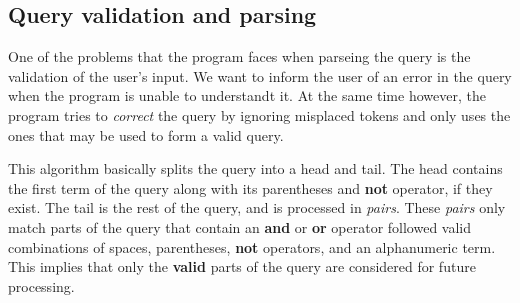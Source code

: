 \documentclass{article}
\begin{document}
\subsection*{Query validation and parsing}
One of the problems that the program faces when parseing the query is the validation of the user's input.
We want to inform the user of an error in the query when the program is unable to understandt it. At the same time however, the program tries to \textit{correct} the query by ignoring misplaced tokens and only uses the ones that may be used to form a valid query.






This algorithm basically splits the query into a head and tail. The head contains the first term of the query along with its parentheses and \textbf{not} operator, if they exist. The tail is the rest of the query, and is processed in \textit{pairs}. These \textit{pairs} only match parts of the query that contain an \textbf{and} or \textbf{or} operator followed valid combinations of spaces, parentheses, \textbf{not} operators, and an alphanumeric term. This implies that only the \textbf{valid} parts of the query are considered for future processing.
\end{document}
